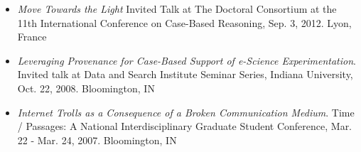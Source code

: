 \documentclass[letterpaper,11pt]{article}
\begin{document}
\begin{itemize}

\item {\it Move Towards the Light} Invited Talk at The Doctoral Consortium at the 11th International
Conference on Case-Based Reasoning, Sep. 3, 2012. Lyon, France



\item {\it Leveraging Provenance for Case-Based Support of e-Science Experimentation}.  Invited talk at Data and Search Institute Seminar Series, Indiana University, Oct. 22, 2008.  Bloomington, IN



\item {\it Internet Trolls as a Consequence of a Broken Communication Medium}. Time / Passages: A National Interdisciplinary Graduate Student Conference, Mar. 22 - Mar. 24, 2007.  Bloomington, IN
\end{itemize}
\end{document}
